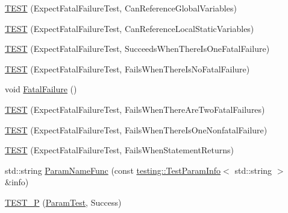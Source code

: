\begin{DoxyCompactItemize}
\item 
\mbox{\hyperlink{_obj__test_2lib_2googletest-release-1_88_81_2googletest_2test_2googletest-output-test___8cc_a4b06191d54fb76270da3d3dd497e62b6}{T\+E\+ST}} (Expect\+Fatal\+Failure\+Test, Can\+Reference\+Global\+Variables)
\item 
\mbox{\hyperlink{_obj__test_2lib_2googletest-release-1_88_81_2googletest_2test_2googletest-output-test___8cc_ac6646aa5f6d4ea21c0528259118754a4}{T\+E\+ST}} (Expect\+Fatal\+Failure\+Test, Can\+Reference\+Local\+Static\+Variables)
\item 
\mbox{\hyperlink{_obj__test_2lib_2googletest-release-1_88_81_2googletest_2test_2googletest-output-test___8cc_a0d894cc9ae86412b4c156748602a23a7}{T\+E\+ST}} (Expect\+Fatal\+Failure\+Test, Succeeds\+When\+There\+Is\+One\+Fatal\+Failure)
\item 
\mbox{\hyperlink{_obj__test_2lib_2googletest-release-1_88_81_2googletest_2test_2googletest-output-test___8cc_af8e8545243605b2ba121e253ec48785e}{T\+E\+ST}} (Expect\+Fatal\+Failure\+Test, Fails\+When\+There\+Is\+No\+Fatal\+Failure)
\item 
void \mbox{\hyperlink{_obj__test_2lib_2googletest-release-1_88_81_2googletest_2test_2googletest-output-test___8cc_acdca9b16622e8a506a39240c8809af38}{Fatal\+Failure}} ()
\item 
\mbox{\hyperlink{_obj__test_2lib_2googletest-release-1_88_81_2googletest_2test_2googletest-output-test___8cc_a4fd11a245bf0e8eb46d78c8dc14c730e}{T\+E\+ST}} (Expect\+Fatal\+Failure\+Test, Fails\+When\+There\+Are\+Two\+Fatal\+Failures)
\item 
\mbox{\hyperlink{_obj__test_2lib_2googletest-release-1_88_81_2googletest_2test_2googletest-output-test___8cc_a35fafc42558ee14c42320b359c270026}{T\+E\+ST}} (Expect\+Fatal\+Failure\+Test, Fails\+When\+There\+Is\+One\+Nonfatal\+Failure)
\item 
\mbox{\hyperlink{_obj__test_2lib_2googletest-release-1_88_81_2googletest_2test_2googletest-output-test___8cc_aca5344af5eed2eefc512c555acbe5511}{T\+E\+ST}} (Expect\+Fatal\+Failure\+Test, Fails\+When\+Statement\+Returns)
\item 
std\+::string \mbox{\hyperlink{_obj__test_2lib_2googletest-release-1_88_81_2googletest_2test_2googletest-output-test___8cc_a61c686cb1c0f8f19c100ff975482ec7a}{Param\+Name\+Func}} (const \mbox{\hyperlink{structtesting_1_1_test_param_info}{testing\+::\+Test\+Param\+Info}}$<$ std\+::string $>$ \&info)
\item 
\mbox{\hyperlink{_obj__test_2lib_2googletest-release-1_88_81_2googletest_2test_2googletest-output-test___8cc_a4e7fc7682f9a8a168b78d53b05fab8bf}{T\+E\+S\+T\+\_\+P}} (\mbox{\hyperlink{class_param_test}{Param\+Test}}, Success)

\end{DoxyCompactItemize}
